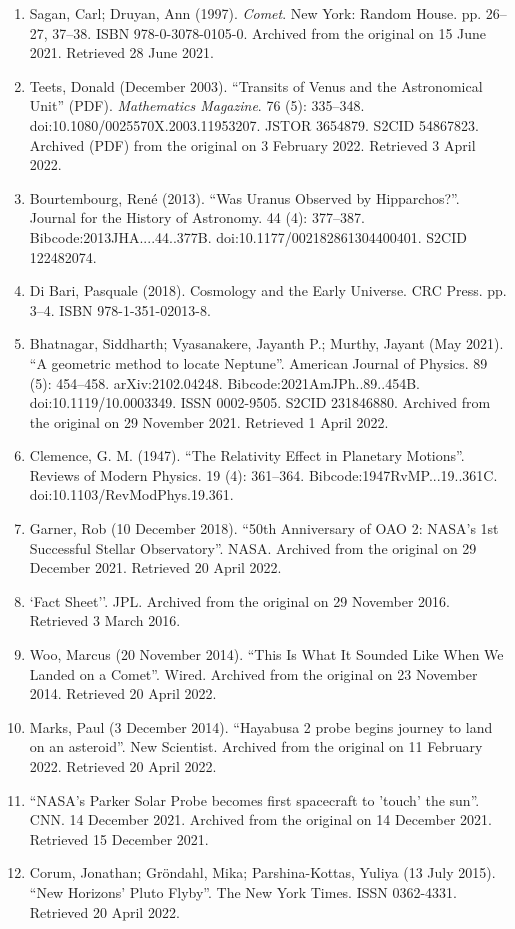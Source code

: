 \begin{enumerate}
\item Sagan, Carl; Druyan, Ann (1997). \textit{Comet}. New York: Random House. pp. 26–27, 37–38. ISBN 978-0-3078-0105-0. Archived from the original on 15 June 2021. Retrieved 28 June 2021.
\item Teets, Donald (December 2003). ``Transits of Venus and the Astronomical Unit'' (PDF). \textit{Mathematics Magazine}. 76 (5): 335–348. doi:10.1080/0025570X.2003.11953207. JSTOR 3654879. S2CID 54867823. Archived (PDF) from the original on 3 February 2022. Retrieved 3 April 2022.
\item Bourtembourg, René (2013). ``Was Uranus Observed by Hipparchos?''. Journal for the History of Astronomy. 44 (4): 377–387. Bibcode:2013JHA....44..377B. doi:10.1177/002182861304400401. S2CID 122482074.
\item Di Bari, Pasquale (2018). Cosmology and the Early Universe. CRC Press. pp. 3–4. ISBN 978-1-351-02013-8.
\item Bhatnagar, Siddharth; Vyasanakere, Jayanth P.; Murthy, Jayant (May 2021). ``A geometric method to locate Neptune''. American Journal of Physics. 89 (5): 454–458. arXiv:2102.04248. Bibcode:2021AmJPh..89..454B. doi:10.1119/10.0003349. ISSN 0002-9505. S2CID 231846880. Archived from the original on 29 November 2021. Retrieved 1 April 2022.
\item Clemence, G. M. (1947). ``The Relativity Effect in Planetary Motions''. Reviews of Modern Physics. 19 (4): 361–364. Bibcode:1947RvMP...19..361C. doi:10.1103/RevModPhys.19.361.
\item Garner, Rob (10 December 2018). ``50th Anniversary of OAO 2: NASA's 1st Successful Stellar Observatory''. NASA. Archived from the original on 29 December 2021. Retrieved 20 April 2022.
\item `Fact Sheet''. JPL. Archived from the original on 29 November 2016. Retrieved 3 March 2016.
\item Woo, Marcus (20 November 2014). ``This Is What It Sounded Like When We Landed on a Comet''. Wired. Archived from the original on 23 November 2014. Retrieved 20 April 2022.
\item Marks, Paul (3 December 2014). ``Hayabusa 2 probe begins journey to land on an asteroid''. New Scientist. Archived from the original on 11 February 2022. Retrieved 20 April 2022.
\item ``NASA's Parker Solar Probe becomes first spacecraft to 'touch' the sun''. CNN. 14 December 2021. Archived from the original on 14 December 2021. Retrieved 15 December 2021.
\item Corum, Jonathan; Gröndahl, Mika; Parshina-Kottas, Yuliya (13 July 2015). ``New Horizons' Pluto Flyby''. The New York Times. ISSN 0362-4331. Retrieved 20 April 2022.

\end{enumerate}
